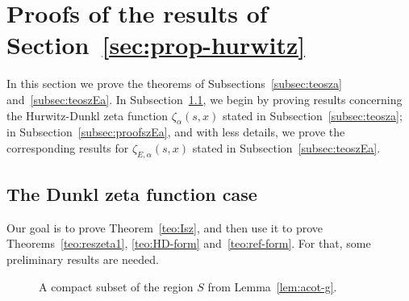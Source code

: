\documentclass[a4paper]{amsart}
\theoremstyle{plain}
\theoremstyle{definition}
\theoremstyle{remark}
\numberwithin{equation}{section}
\begin{document}

\section{Proofs of the results of Section~\ref{sec:prop-hurwitz}}
\label{sec:proof-of-ths}

In this section we prove the theorems of Subsections~\ref{subsec:teosza} and~\ref{subsec:teoszEa}. 
In Subsection~\ref{subsec:proofsza}, we begin by proving results concerning the Hurwitz-Dunkl zeta function $\zeta_{\alpha}(s,x)$ stated in Subsection~\ref{subsec:teosza}; in Subsection~\ref{subsec:proofszEa}, and with less details, we prove the corresponding results for $\zeta_{E,\alpha}(s,x)$ stated in Subsection~\ref{subsec:teoszEa}.

\subsection{The Dunkl zeta function case}
\label{subsec:proofsza}

Our goal is to prove Theorem~\ref{teo:Isz}, and then use it to prove Theorems~\ref{teo:reszeta1}, \ref{teo:HD-form} and~\ref{teo:ref-form}. For that, some preliminary results are needed.

\begin{figure}[b]
    \centering
    \caption{A compact subset of the region $S$ from Lemma~\ref{lem:acot-g}.}
    \label{fig:reg-s}
\end{figure}
\end{document}
